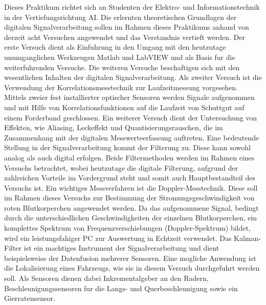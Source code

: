 \begin{module}
\begin{content}
Dieses Praktikum richtet sich an Studenten der Elektro- und Informationstechnik in der Vertiefungsrichtung AI. Die erlernten theoretischen Grundlagen der digitalen Signalverarbeitung sollen im Rahmen dieses Praktikums anhand von derzeit acht Versuchen angewendet und das Verstandnis vertieft werden. Der erste Versuch dient als Einfuhrung in den Umgang mit den heutzutage unumganglichen Werkzeugen Matlab und LabVIEW und als Basis fur die weiterfuhrenden Versuche. Die weiteren Versuche beschaftigen sich mit den wesentlichen Inhalten der digitalen Signalverarbeitung.\newline
Als zweiter Versuch ist die Verwendung der Korrelationsmesstechnik zur Laufzeitmessung vorgesehen. Mittels zweier fest installierter optischer Sensoren werden Signale aufgenommen und mit Hilfe von Korrelationsfunktionen auf die Laufzeit von Schuttgut auf einem Forderband geschlossen.\newline
Ein weiterer Versuch dient der Untersuchung von Effekten, wie Aliasing, Leckeffekt und Quantisierungsrauschen, die im Zusammenhang mit der digitalen Messwerteerfassung auftreten.\newline
Eine bedeutende Stellung in der Signalverarbeitung kommt der Filterung zu. Diese kann sowohl analog als auch digital erfolgen. Beide Filtermethoden werden im Rahmen eines Versuchs betrachtet, wobei heutzutage die digitale Filterung, aufgrund der zahlreichen Vorteile im Vordergrund steht und somit auch Hauptbestandteil des Versuchs ist.\newline
Ein wichtiges Messverfahren ist die Doppler-Messtechnik. Diese soll im Rahmen dieses Versuchs zur Bestimmung der Stromungsgeschwindigkeit von roten Blutkorperchen angewendet werden. Da das aufgenommene Signal, bedingt durch die unterschiedlichen Geschwindigkeiten der einzelnen Blutkorperchen, ein komplettes Spektrum von Frequenzverschiebungen (Doppler-Spektrum) bildet, wird ein leistungsfahiger PC zur Auswertung in Echtzeit verwendet.\newline
Das Kalman-Filter ist ein machtiges Instrument der Signalverarbeitung und dient beispielsweise der Datenfusion mehrerer Sensoren. Eine mogliche Anwendung ist die Lokalisierung eines Fahrzeugs, wie sie in diesem Versuch durchgefuhrt werden soll. Als Sensoren dienen dabei Inkrementalgeber an den Radern, Beschleunigungssensoren fur die Langs- und Querbeschleunigung sowie ein Gierratensensor.


\end{content}



\end{module}

